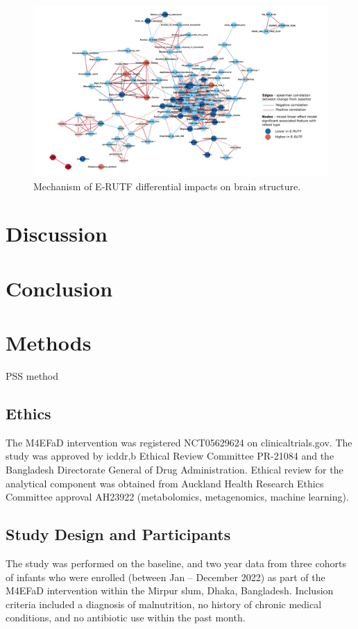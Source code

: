 \documentclass{article}
\begin{document}
\begin{figure}[H]
\centering
\includegraphics[scale=0.5]{figures/mixedmodelnetwork.pdf}
	\caption[Mechanism of E-RUTF differential impacts on brain structure]{
		Mechanism of E-RUTF differential impacts on brain structure.
	}
\label{Figure3}
\end{figure}

\section{Discussion}

\section{Conclusion}

\section{Methods}
PSS method \cite{mozumder2022reliability}

\subsection{Ethics}
The M4EFaD intervention was registered NCT05629624 on clinicaltrials.gov.
The study was approved by icddr,b Ethical Review Committee PR-21084 and the Bangladesh Directorate General of Drug Administration.
Ethical review for the analytical component was obtained from Auckland Health Research Ethics Committee approval AH23922 (metabolomics, metagenomics, machine learning).

\subsection{Study Design and Participants}
The study was performed on the baseline, and two year data from three cohorts of infants who were enrolled (between Jan – December 2022) as part of the M4EFaD intervention within the Mirpur slum, Dhaka, Bangladesh.
Inclusion criteria included a diagnosis of malnutrition, no history of chronic medical conditions, and no antibiotic use within the past month.
\end{document}
